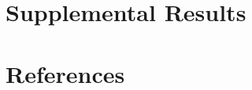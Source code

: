 \documentclass[review,3p,authoryear]{elsarticle}
\begin{document}
\section{Supplemental Results}\label{a:results}

\clearpage
\section*{References}

\end{document}
